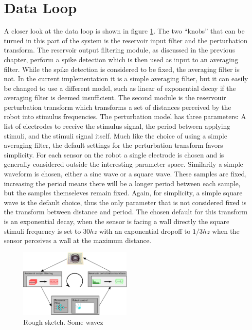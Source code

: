 \section{Data Loop}
A closer look at the data loop is shown in figure \ref{figDataLoop}.
The two ``knobs'' that can be turned in this part of the system is the reservoir
input filter and the perturbation transform.
The reservoir output filtering module, as discussed in the previous chapter,
perform a spike detection which is then used as input to an averaging filter.
While the spike detection is considered to be fixed, the averaging filter is
not.
In the current implementation it is a simple averaging filter, but it can easily
be changed to use a different model, such as linear of exponential decay if the
averaging filter is deemed insufficient.
The second module is the reservouir perturbation transform which transforms a
set of distances perceived by the robot into stimulus frequencies.
The perturbation model has three parameters: A list of electrodes to receive the
stimulus signal, the period between applying stimuli, and the stimuli signal
itself.
Much like the choice of using a simple averaging filter, the default settings
for the perturbation transform favors simplicity.
For each sensor on the robot a single electrode is chosen and is generally
considered outside the interesting parameter space.
Similarily a simple waveform is chosen, either a sine wave or a square wave.
These samples are fixed, increasing the period means there will be a longer
period between each sample, but the samples themseleves remain fixed.
Again, for simplicity, a simple square wave is the default choice, thus the only
parameter that is not considered fixed is the transform between distance and
period.
The chosen default for this transform is an exponential decay, when the sensor
is facing a wall directly the square stimuli frequency is set to $30hz$ with an
exponential dropoff to $1/3hz$ when the sensor perceives a wall at the maximum
distance.
\begin{figure}[h!]
  \centering
  \includegraphics[width=0.5\textwidth]{fig/RCloop.png}
  \caption{Rough sketch.
    Some wavez
  }
  \label{figDataLoop}
\end{figure}
%
